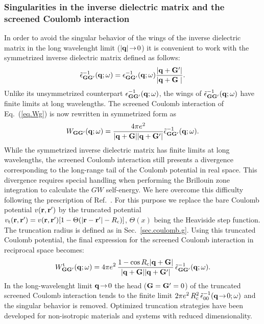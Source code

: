 \documentclass[twocolumn,prb,showpacs,superscriptaddress]{revtex4}
\def\w{\omega}
\def\q{{\bf q}}
\def\G{{\bf G}}
\def\Gp{{\bf G^\prime}}
\def\r{{\bf r}}
\def\rp{{\bf r^\prime}}
\begin{document}
\subsubsection{Singularities in the inverse dielectric matrix and the screened Coulomb interaction}

In order to avoid the singular behavior of the wings of the inverse dielectric matrix 
in the long wavelenght limit ($|\q|\!\rightarrow\!0$) it is convenient to work with
the symmetrized inverse dielectric matrix defined as follows:\cite{balde_tosa}
  \begin{equation}
  \tilde\epsilon^{-1}_{\G\Gp}(\q;\w) = \epsilon^{-1}_{\G\Gp}(\q;\w)  \frac{|\q+\Gp|}{|\q+\G\phantom{^\prime}|}.
  \end{equation}
Unlike its unsymmetrized counterpart $\epsilon^{-1}_{\G\Gp}(\q;\w)$,
the wings of $\tilde\epsilon^{-1}_{\G\Gp}(\q;\w)$ have finite limits 
at long wavelengths.
%
The screened Coulomb interaction of Eq.\ (\ref{eq.Wg}) is now rewritten in symmetrized form
as
  \begin{equation}\label{eq.Wg_symm}
  W_{\G\Gp}(\q;\w) = \frac{4\pi e^2}{|\q+\G||\q+\Gp|}  \tilde\epsilon^{-1}_{\G\Gp}(\q;\w).
  \end{equation}
While the symmetrized inverse dielectric matrix has finite limits at long wavelengths,
the screened Coulomb interaction still presents a divergence corresponding to the
long-range tail of the Coulomb potential in real space. This divergence requires special
handling when performing the Brillouin zone integration to calculate 
the $GW$ self-energy.\cite{hl86}
We here overcome this difficulty following the prescription of
Ref.~. For this purpose we replace
the bare Coulomb potential $v(\r,\rp)$ by the truncated potential 
$v_{\rm t}(\r,\rp)=v(\r,\rp)[1-\Theta(|\r-\rp|-R_{\rm c})]$, 
$\Theta(x)$ being the Heaviside step function.
The truncation radius is defined as in Sec.\ \ref{sec.coulomb.g}. 
Using this truncated Coulomb potential, the final expression for the screened 
Coulomb interaction in reciprocal space becomes:
  \begin{equation}\label{eq.Wg_symm}
  W^{\rm t}_{\G\Gp}(\q;\w) = 4\pi e^2 \, \frac{1-\cos{R_{\rm c}|\q+\G|}}{|\q+\G||\q+\Gp|}\,
     \tilde\epsilon^{-1}_{\G\Gp}(\q;\w).
  \end{equation}
In the long-wavelenght limit $\q\!\rightarrow\!0$ the head ($\G=\Gp=0$) of the truncated
screened Coulomb interaction tends to
the finite limit 
$2\pi e^2 \, R_{\rm c}^2 \, \tilde\epsilon^{-1}_{00}(\q\!\rightarrow\!0;\w)$
and the singular behavior is removed.
Optimized truncation strategies have been developed for non-isotropic materials
and systems with reduced dimensionality.\cite{sohrab}
\end{document}
